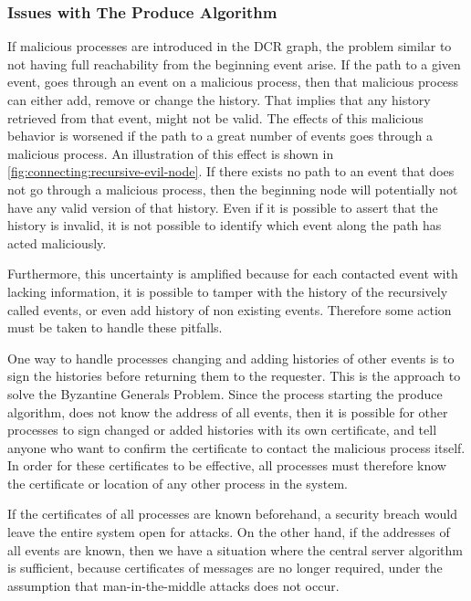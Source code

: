 	\subsubsection*{Issues with The Produce Algorithm}
	If malicious processes are introduced in the DCR graph, the problem similar to not having full reachability from the beginning event arise. If the path to a given event, goes through an event on a malicious process, then that malicious process can either add, remove or change the history. That implies that any history retrieved from that event, might not be valid. The effects of this malicious behavior is worsened if the path to a great number of events goes through a malicious process. An illustration of this effect is shown in \autoref{fig:connecting:recursive-evil-node}. If there exists no path to an event that does not go through a malicious process, then the beginning node will potentially not have any valid version of that history. Even if it is possible to assert that the history is invalid, it is not possible to identify which event along the path has acted maliciously.
	
	\newpar Furthermore, this uncertainty is amplified because for each contacted event with lacking information, it is possible to tamper with the history of the recursively called events, or even add history of non existing events. Therefore some action must be taken to handle these pitfalls.
	
	\newpar One way to handle processes changing and adding histories of other events is to sign the histories before returning them to the requester. This is the approach to solve the Byzantine Generals Problem. Since the process starting the produce algorithm, does not know the address of all events, then it is possible for other processes to sign changed or added histories with its own certificate, and tell anyone who want to confirm the certificate to contact the malicious process itself. In order for these certificates to be effective, all processes must therefore know the certificate or location of any other process in the system.
	
	\newpar If the certificates of all processes are known beforehand, a security breach would leave the entire system open for attacks. On the other hand, if the addresses of all events are known, then we have a situation where the central server algorithm is sufficient, because certificates of messages are no longer required, under the assumption that man-in-the-middle attacks does not occur.
	
